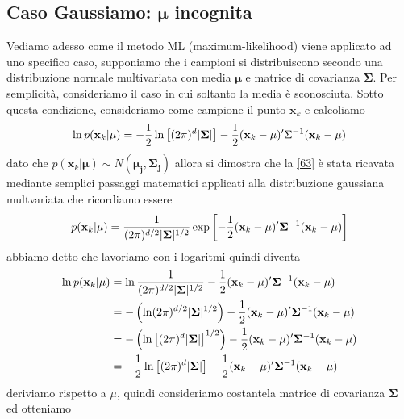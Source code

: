 \subsection{Caso Gaussiamo: $\mathbf{\mu}$ incognita }
Vediamo adesso come il metodo ML (maximum-likelihood) viene applicato ad uno specifico caso,  supponiamo che i campioni si distribuiscono secondo una distribuzione normale multivariata con media $\mathbf{\mu}$ e matrice di covarianza $\mathbf{\Sigma}$. Per semplicità, consideriamo il caso in cui soltanto la media è sconosciuta. Sotto questa condizione, consideriamo come campione il punto $\mathbf{x}_k$ e calcoliamo
\begin{equation}\label{63}
\ln p(\mathbf{x}_k|\mathbf{\mu}) = -\frac{1}{2} \ln \left[ (2\pi)^d \lvert\mathbf{\Sigma}\rvert \right]  - \frac{1}{2}(\mathbf{x}_k - \mathbf{\mu})' \Sigma^{-1}(\mathbf{x}_k - \mathbf{\mu})
\end{equation}
dato che $p(\mathbf{x}_k|\mathbf{\mu}) \sim N(\mathbf{\mu_j, \Sigma_j})$ allora si dimostra che la \ref{63} è stata ricavata mediante semplici passaggi matematici applicati alla distribuzione gaussiana multvariata che ricordiamo essere
\begin{equation}\label{distribuzioneMultivariata}
p(\mathbf{x}_k|\mu) = \frac{1}{(2\pi)^{d/2} \lvert\mathbf{\Sigma}\rvert^{1/2}} \exp \left [ - \frac{1}{2} (\mathbf{x}_k - \mathbf{\mu})'  \mathbf{\Sigma}^{-1} (\mathbf{x}_k - \mathbf{\mu}) \right ]
\end{equation}
abbiamo detto che lavoriamo con i logaritmi quindi diventa
\begin{equation}
\begin{split}
\ln p(\mathbf{x}_k|\mu) &= \ln \frac{1}{(2\pi)^{d/2} \lvert\mathbf{\Sigma}\rvert^{1/2}} - \frac{1}{2} (\mathbf{x}_k - \mathbf{\mu})'  \mathbf{\Sigma}^{-1} (\mathbf{x}_k - \mathbf{\mu})\\
&= - \left( \ln (2\pi)^{d/2} \lvert\mathbf{\Sigma}\rvert^{1/2} \right) - \frac{1}{2} (\mathbf{x}_k - \mathbf{\mu})'  \mathbf{\Sigma}^{-1} (\mathbf{x}_k - \mathbf{\mu})\\
&= - \left( \ln \left[ (2\pi)^d \lvert\mathbf{\Sigma}\rvert \right]^{1/2} \right) - \frac{1}{2} (\mathbf{x}_k - \mathbf{\mu})'  \mathbf{\Sigma}^{-1} (\mathbf{x}_k - \mathbf{\mu})\\
&= - \frac{1}{2} \ln \left[ (2\pi)^d \lvert\mathbf{\Sigma}\rvert \right] - \frac{1}{2} (\mathbf{x}_k - \mathbf{\mu})'  \mathbf{\Sigma}^{-1} (\mathbf{x}_k - \mathbf{\mu})
\end{split}
\end{equation}
deriviamo rispetto a $\mu$, quindi consideriamo costantela matrice di covarianza $\mathbf{\Sigma}$ ed otteniamo
